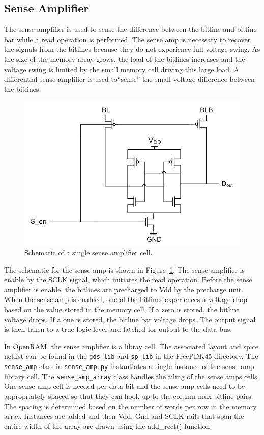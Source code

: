 \subsection{Sense Amplifier}
\label{sec:senseamp}
The sense amplifier is used to sense the difference between the
bitline and bitline bar while a read operation is performed.  The
sense amp is necessary to recover the signals from the bitlines
because they do not experience full voltage swing.  As the size of the
memory array grows, the load of the bitlines increases and the voltage
swing is limited by the small memory cell driving this large load.  A
differential sense amplifier is used to``sense'' the small voltage
difference between the bitlines.

\begin{figure}[h!]
\centering
\includegraphics[scale=.8]{./figs/sense_amp_schem.pdf}
\caption{Schematic of a single sense amplifier cell.}
\label{fig:sense_amp}
\end{figure}

The schematic for the sense amp is shown in
Figure~\ref{fig:sense_amp}.  The sense amplifier is enable by the SCLK
signal, which initiates the read operation.  Before the sense
amplifier is enable, the bitlines are precharged to Vdd by the
precharge unit.  When the sense amp is enabled, one of the bitlines
experiences a voltage drop based on the value stored in the memory
cell.  If a zero is stored, the bitline voltage drops.  If a one is
stored, the bitline bar voltage drops.  The output signal is then
taken to a true logic level and latched for output to the data bus.

In OpenRAM, the sense amplifier is a libray cell.  The associated
layout and spice netlist can be found in the \verb|gds_lib| and \verb|sp_lib| in
the FreePDK45 directory.  The \verb|sense_amp| class in \verb|sense_amp.py|
instantiates a single instance of the sense amp library cell.  The
\verb|sense_amp_array| class handles the tiling of the sense amps cells.
One sense amp cell is needed per data bit and the sense amp cells need
to be appropriately spaced so that they can hook up to the column mux
bitline pairs.  The spacing is determined based on the number of words
per row in the memory array.  Instances are added and then Vdd, Gnd
and SCLK rails that span the entire width of the array are drawn using
the add\_rect() function.


